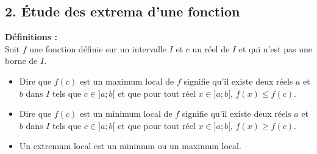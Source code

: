 \documentclass[11pt,a4paper]{article}
\begin{document}
\subsection*{2. Étude des extrema d'une fonction}

\begin{mdframed}[style=definitionStyle]
    \textbf{Définitions :} ~\\
    Soit $f$ une fonction définie sur un intervalle $I$ et $c$ un réel de $I$ et qui n'est pas une borne de $I$.
    \vspace{-4pt}
    \begin{itemize}
        \item Dire que $f(c)$ est un maximum local de $f$ signifie qu'il existe deux réels $a$ et $b$ dans $I$ tels que $c\in]a;b[$ et que pour tout réel $x\in]a;b[$, $f(x) \leq f(c)$.
        \item Dire que $f(c)$ est un minimum local de $f$ signifie qu'il existe deux réels $a$ et $b$ dans $I$ tels que $c\in]a;b[$ et que pour tout réel $x\in]a;b[$, $f(x) \geq f(c)$.
        \item Un extremum local est un minimum ou un maximum local.
    \end{itemize}



\end{mdframed}
\end{document}
